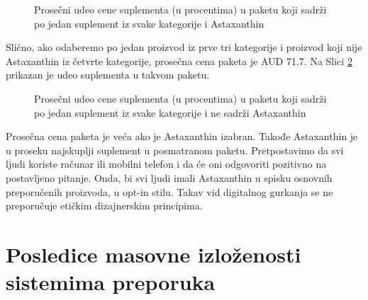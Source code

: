 \documentclass[a4paper]{article}
\begin{document}
\begin{figure}[h!]
\centering
{}
\caption{Prosečni udeo cene suplementa (u procentima) u paketu koji sadrži po jedan suplement iz svake kategorije i Astaxanthin}
\label{fig:astaxanthin}
\end{figure}

\newpage

Slično, ako odaberemo po jedan proizvod iz prve tri kategorije i proizvod koji nije Astaxanthin iz četvrte kategorije, prosečna cena paketa je AUD 71.7. Na Slici \ref{fig:wout_astaxanthin} prikazan je udeo suplementa u takvom paketu.

\begin{figure}[h!]
\centering
{}
\caption{Prosečni udeo cene suplementa (u procentima) u paketu koji sadrži po jedan suplement iz svake kategorije i ne sadrži Astaxanthin}
\label{fig:wout_astaxanthin}
\end{figure}

Prosečna cena paketa je veća ako je Astaxanthin izabran. Takođe Astaxanthin je u proseku najskuplji suplement u posmatranom paketu. Pretpostavimo da svi ljudi koriste računar ili mobilni telefon i da će oni odgovoriti pozitivno na postavljeno pitanje. Onda, bi svi ljudi imali Astaxanthin u spisku osnovnih preporučenih proizvoda, u opt-in stilu. Takav vid digitalnog gurkanja se ne preporučuje etičkim dizajnerskim principima.

\section{Posledice masovne izloženosti sistemima preporuka}
\label{sec:posledice_masovne_izloženosti 1}
\end{document}
